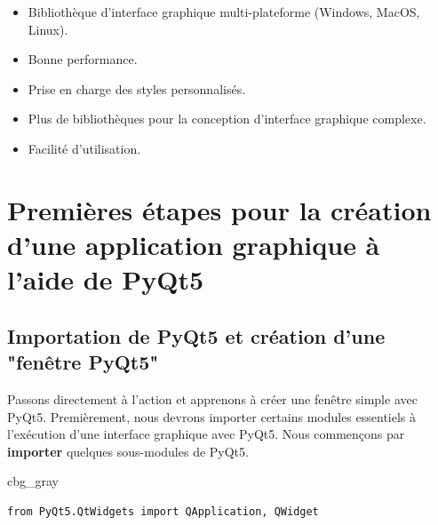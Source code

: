 \documentclass[%
oneside,                 %
final,                   %
10pt,french]{article}
\newenvironment{_cod_tight}[1]{
   \def\FrameCommand{\colorbox{#1}}
   \FrameRule0.6pt\MakeFramed {\FrameRestore}\vskip3mm}
   {\vskip0mm\endMakeFramed}
\newenvironment{cod}[1]{
\bgroup\rmfamily
\fboxsep=0mm\relax
\begin{_cod_tight}{#1}
\list{}{\parsep=-2mm\parskip=0mm\topsep=0pt\leftmargin=2mm
\rightmargin=2\leftmargin\leftmargin=4pt\relax}
\item\relax}
{\endlist\end{_cod_tight}\egroup}
\begin{document}
\begin{itemize}
\item Bibliothèque d'interface graphique multi-plateforme (Windows, MacOS, Linux).

\item Bonne performance.

\item Prise en charge des styles personnalisés.

\item Plus de bibliothèques pour la conception d'interface graphique complexe.

\item Facilité d'utilisation.
\end{itemize}

\noindent
\section{Premières étapes pour la création d'une application graphique à l'aide de PyQt5}

\subsection{Importation de PyQt5 et création d'une "fenêtre PyQt5"}

Passons directement à l'action et apprenons à créer une fenêtre simple avec PyQt5. Premièrement, nous devrons importer certains modules essentiels à l’exécution d’une interface graphique avec PyQt5. Nous commençons par \textbf{importer} quelques sous-modules de PyQt5.

\begin{cod}{cbg_gray}\begin{verbatim}
from PyQt5.QtWidgets import QApplication, QWidget
\end{verbatim}
\end{cod}
\noindent
\end{document}
